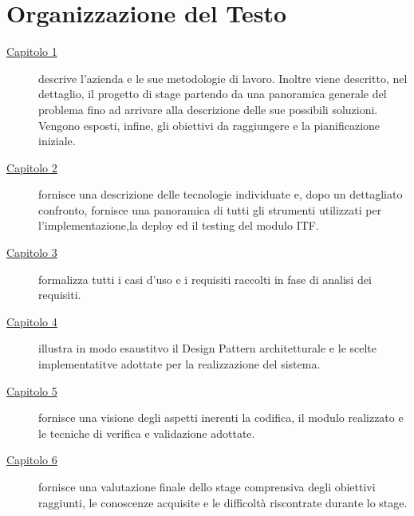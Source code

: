 
\cleardoublepage
{}
{}
\begingroup
\let\clearpage\relax
\let\cleardoublepage\relax
\let\cleardoublepage\relax

\chapter*{Organizzazione del Testo}

\begin{description}
	\item[{\hyperref[cap:introduzione]{Capitolo 1}}] descrive l'azienda e le sue metodologie di lavoro. Inoltre viene descritto, nel dettaglio, il progetto di stage partendo da una panoramica generale del problema fino ad arrivare alla descrizione delle sue possibili soluzioni. Vengono esposti, infine, gli obiettivi da raggiungere e la pianificazione iniziale.
	
	\item[{\hyperref[cap:tecnologie_e_strumenti]{Capitolo 2}}] fornisce una descrizione delle tecnologie individuate e, dopo un dettagliato confronto, fornisce una panoramica di tutti gli strumenti utilizzati per l'implementazione,la deploy ed il testing del modulo ITF. 
	
	\item[{\hyperref[cap:analisi-requisiti]{Capitolo 3}}] formalizza tutti i casi d'uso e i requisiti raccolti in fase di analisi dei requisiti.
	
	\item[{\hyperref[cap:progettazione]{Capitolo 4}}] illustra in modo esaustitvo il Design Pattern architetturale e le scelte implementatitve adottate per la realizzazione del sistema.
	
	\item[{\hyperref[cap:codifica_e_verifia]{Capitolo 5}}] fornisce una visione degli aspetti inerenti la codifica, il modulo realizzato e le tecniche di verifica e validazione adottate.
	
	\item[{\hyperref[cap:analisi-requisiti]{Capitolo 6}}] fornisce una valutazione finale dello stage comprensiva degli obiettivi raggiunti, le conoscenze acquisite e le difficoltà riscontrate durante lo stage.
	
\end{description}

